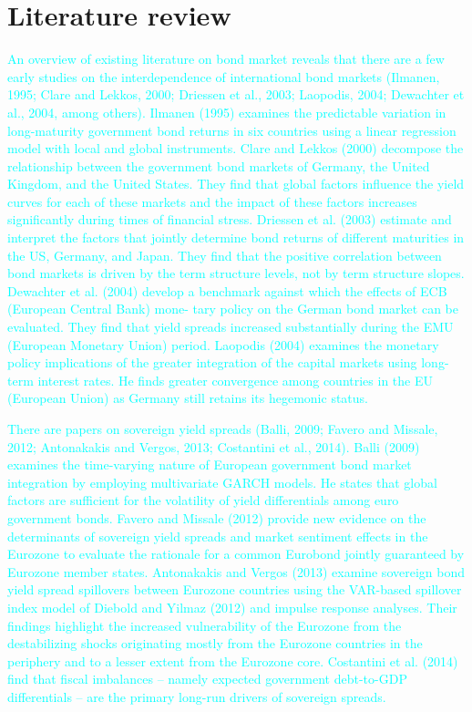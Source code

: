 \documentclass[12pt,bibliography=totoc]{article}
\begin{document}
\newpage

\section{Literature review}


\textcolor{cyan}{An overview of existing literature on bond market reveals that there are a few early studies on the interdependence of international bond markets (Ilmanen, 1995; Clare and Lekkos, 2000; Driessen et al., 2003; Laopodis, 2004; Dewachter et al., 2004, among others). Ilmanen (1995) examines the predictable variation in long-maturity government bond returns in six countries
using a linear regression model with local and global instruments. Clare and Lekkos (2000) decompose the relationship between the government bond markets of Germany, the United Kingdom, and the United States. They find that global factors influence the yield curves for each of these markets and the impact of these factors increases significantly during times of financial stress.
Driessen et al. (2003) estimate and interpret the factors that jointly determine bond returns of different maturities in the US, Germany, and Japan. They find that the positive correlation between bond markets is driven by the term structure levels, not by term structure slopes. Dewachter et al. (2004) develop a benchmark against which the effects of ECB (European Central Bank) mone-
tary policy on the German bond market can be evaluated. They find that yield spreads increased substantially during the EMU (European Monetary Union) period. Laopodis (2004) examines the monetary policy implications of the greater integration of the capital markets using long-term interest rates. He finds greater convergence among countries in the EU (European Union)
as Germany still retains its hegemonic status.} 

\textcolor{cyan}{There are papers on sovereign yield spreads (Balli, 2009; Favero and Missale, 2012; Antonakakis and Vergos, 2013; Costantini et al., 2014). Balli (2009) examines the time-varying nature of European government bond market integration by employing multivariate GARCH models. He states that global factors are sufficient for the volatility of yield differentials among euro government bonds. Favero and Missale (2012) provide new evidence on the determinants of sovereign yield spreads and market sentiment effects in the Eurozone to evaluate the rationale for a common Eurobond jointly guaranteed by Eurozone member states. Antonakakis and Vergos (2013) examine sovereign bond yield spread spillovers between Eurozone countries using the VAR-based spillover index model of Diebold and Yilmaz (2012) and impulse response analyses. Their findings highlight the increased vulnerability of the Eurozone from the destabilizing shocks originating mostly from the Eurozone countries in the periphery and to a lesser extent from the Eurozone core. Costantini et al. (2014) find that fiscal imbalances – namely expected government debt-to-GDP differentials – are the primary long-run drivers of sovereign spreads.}
\end{document}
